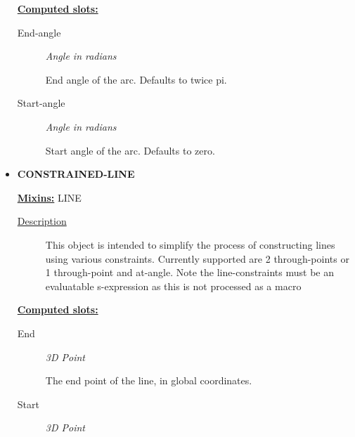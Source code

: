 \documentclass [11pt]{book}
\begin{document}
\begin{itemize}
\textbf{
\underline{Computed slots:}}

\begin{description}

\item [End-angle]
\emph{Angle in radians}

 End angle of the arc. Defaults to twice pi.




\item [Start-angle]
\emph{Angle in radians}

 Start angle of the arc. Defaults to zero.




\end{description}







\item {}
\label{prim:constrained-line}
\textbf{CONSTRAINED-LINE}


\textbf{
\underline{Mixins:}} LINE





\begin{description}

\item [
\underline{Description}]


This object is intended to simplify the process of
   constructing lines using various constraints. Currently supported
   are 2 through-points or 1 through-point and at-angle. Note the
   line-constraints must be an evaluatable s-expression as this is not
   processed as a macro



\end{description}








\textbf{
\underline{Computed slots:}}

\begin{description}

\item [End]
\emph{3D Point}

 The end point of the line, in global coordinates.




\item [Start]
\emph{3D Point}


\end{description}
\end{itemize}
\end{document}

